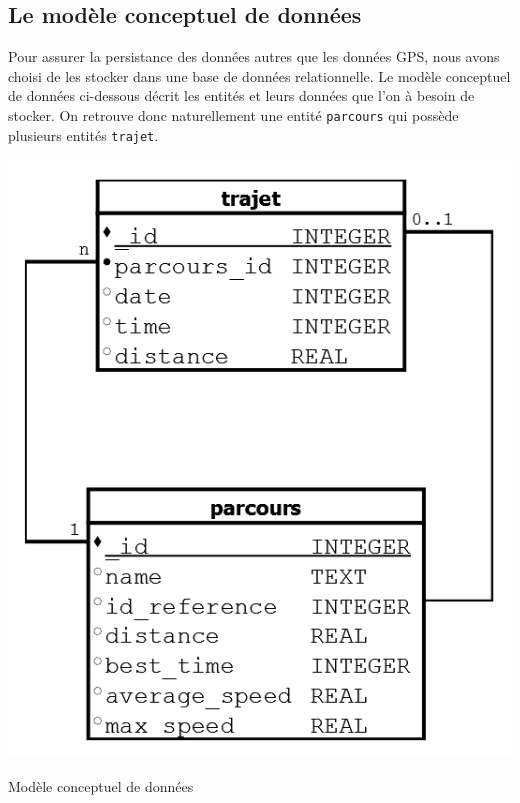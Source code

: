 \subsection{Le modèle conceptuel de données}
Pour assurer la persistance des données autres que les données GPS, nous avons choisi de les stocker dans une base de données relationnelle. Le modèle conceptuel de données ci-dessous décrit les entités et leurs données que l'on à besoin de stocker. On retrouve donc naturellement une entité \verb!parcours! qui possède plusieurs entités \verb!trajet!. 
\begin{img}
  \includegraphics[scale=0.3]{img/bdd.png}
  \caption{Modèle conceptuel de données}
\end{img}
